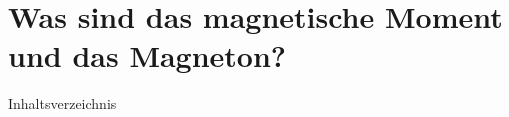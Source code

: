 \documentclass[t,9pt]{beamer}
\newcommand{\highlight}[3]{ \begin{textblock*}{#1}(#2,#3) \begin{tcolorbox} [enhanced,opacityfill=.1,colback=blue] \end{tcolorbox} \end{textblock*} } %
\begin{document}

        \section{Was sind das magnetische Moment und das Magneton?}

        \begin{frame}{Inhaltsverzeichnis}
                \tableofcontents[currentsection]
        \end{frame}
\end{document}
